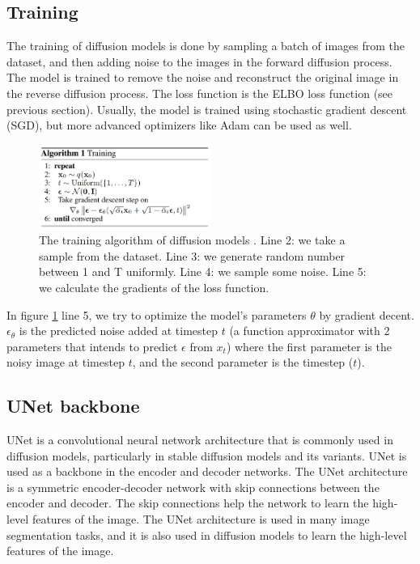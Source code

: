 \subsection{Training}

The training of diffusion models is done by sampling a batch of images from the dataset, and then adding noise to the images in the forward diffusion process. The model is trained to remove the noise and reconstruct the original image in the reverse diffusion process. The loss function is the ELBO loss function (see previous section). Usually, the model is trained using stochastic gradient descent (SGD), but more advanced optimizers like Adam can be used as well.

\begin{figure}
    \centering
    \includegraphics[width=0.5\textwidth]{images/diffusion_models/training.png}
    \caption{The training algorithm of diffusion models \cite{ddpm}. Line 2: we take a sample from the dataset. Line 3: we generate random number between 1 and T uniformly. Line 4: we sample some noise. Line 5: we calculate the gradients of the loss function.}
    \label{fig:ddpm_training}
\end{figure}

In figure \ref{fig:ddpm_training} line 5, we try to optimize the model's parameters $\theta$ by gradient decent. $\epsilon_\theta$ is the predicted noise added at timestep $t$ (a function approximator with 2 parameters that intends to predict $\epsilon$ from $x_t$) where the first parameter is the noisy image at timestep $t$, and the second parameter is the timestep ($t$). 







\subsection{UNet backbone}

UNet is a convolutional neural network architecture that is commonly used in diffusion models, particularly in stable diffusion models and its variants. UNet is used as a backbone in the encoder and decoder networks. The UNet architecture is a symmetric encoder-decoder network with skip connections between the encoder and decoder. The skip connections help the network to learn the high-level features of the image. The UNet architecture is used in many image segmentation tasks, and it is also used in diffusion models to learn the high-level features of the image.

